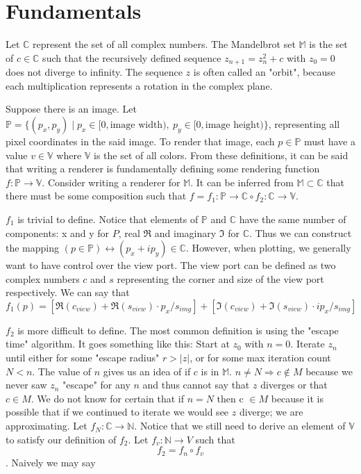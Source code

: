 \documentclass{article}
\begin{document}
\section{Fundamentals}
\par Let $\mathbb{C}$ represent the set of all complex numbers. The Mandelbrot set $\mathbb{M}$ is the set of $c\in\mathbb{C}$ such that the recursively defined sequence \( z_{n+1} = z_n^2 + c \) with \( z_0 = 0 \) does not diverge to infinity. The sequence $z$ is often called an "orbit", because each multiplication represents a rotation in the complex plane.
\par Suppose there is an image. Let $\mathbb{P}= \{(p_x,p_y) \mid p_x\in[0,\text{image width}),\ p_y\in[0,\text{image height})\}$, representing all pixel coordinates in the said image. To render that image, each $p\in\mathbb{P}$ must have a value $v\in\mathbb{V}$ where $\mathbb{V}$ is the set of all colors. From these definitions, it can be said that writing a renderer is fundamentally defining some rendering function $f:\mathbb{P}\rightarrow \mathbb{V}$. Consider writing a renderer for $\mathbb{M}$. It can be inferred from $\mathbb{M}\subset\mathbb{C}$ that there must be some composition such that $f = f_1:\mathbb{P} \rightarrow \mathbb{C} \circ f_2:\mathbb{C} \rightarrow\mathbb{V}$.
\par $f_1$ is trivial to define. Notice that elements of $\mathbb{P}$ and $\mathbb{C}$ have the same number of components: x and y for $P$, real $\Re$ and imaginary $\Im$ for $\mathbb{C}$. Thus we can construct the mapping $(p\in \mathbb{P})\leftrightarrow (p_x + ip_y)\in\mathbb{C}$. However, when plotting, we generally want to have control over the view port. The view port can be defined as two complex numbers $c$ and $s$ representing the corner and size of the view port respectively. We can say that \[f_1(p)=[\Re(c_{view}) + \Re(s_{view}) \cdot p_x/s_{img}] +[\Im(c_{view}) + \Im(s_{view}) \cdot  ip_x/s_{img}]\]
\par $f_2$ is more difficult to define. The most common definition is using the "escape time" algorithm. It goes something like this: Start at $z_0$ with $n=0$. Iterate $z_n$ until either for some "escape radius" $r > |z|$, or for some max iteration count $N < n$. The value of $n$ gives us an idea of if $c$ is in $\mathbb{M}$. $n \neq N \Rightarrow c \notin M$ because we never saw $z_n$ "escape" for any $n$ and thus cannot say that $z$ diverges or that $c \in M$. We do not know for certain that if $n=N $ then c $\in M$ because it is possible that if we continued to iterate we would see $z$ diverge; we are approximating.  Let $f_N:\mathbb{C}\rightarrow \mathbb{N}$. Notice that we still need to derive an element of $\mathbb{V}$ to satisfy our definition of $f_2$. Let $f_v:\mathbb{N}\rightarrow V$ such that \[f_2=f_n \circ f_v \]. Naively we may say
\end{document}

